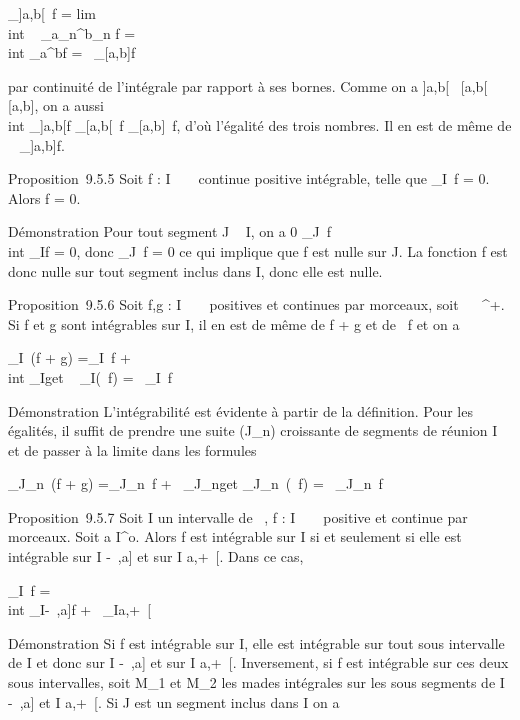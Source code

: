 \documentclass[]{article}
\begin{document}
\int  \_{]}a,b{[}~f
= lim\\int ~
\_a\_n^b\_n f =\\int
 \_a^bf =\int ~
\_{[}a,b{]}f

par continuité de l'intégrale par rapport à ses bornes. Comme on a
{]}a,b{[}\subset~ {[}a,b{[}\subset~ {[}a,b{]}, on a aussi \\int
 \_{]}a,b{[}f \leq\int  \_{[}a,b{[}~f
\leq\int  \_{[}a,b{]}~f, d'où l'égalité des
trois nombres. Il en est de même de \int ~
\_{]}a,b{]}f.

Proposition~9.5.5 Soit f : I \rightarrow~ ~ continue positive intégrable, telle que
\int  \_I~f = 0. Alors f = 0.

Démonstration Pour tout segment J \subset~ I, on a 0
\leq\int  \_J~f \leq\\int
 \_If = 0, donc \int  \_J~f = 0 ce
qui implique que f est nulle sur J. La fonction f est donc nulle sur
tout segment inclus dans I, donc elle est nulle.

Proposition~9.5.6 Soit f,g : I \rightarrow~ ~ positives et continues par morceaux,
soit \alpha~ \in {}~^+. Si f et g sont intégrables sur I, il en est de
même de f + g et de \alpha~f et on a

\int  \_I~(f + g)
=\int  \_I~f +\\int
 \_Ig\text et \int ~
\_I(\alpha~f) = \alpha~\int  \_I~f

Démonstration L'intégrabilité est évidente à partir de la définition.
Pour les égalités, il suffit de prendre une suite (J\_n)
croissante de segments de réunion I et de passer à la limite dans les
formules

\int  \_J\_n~(f + g)
=\int  \_J\_n~f
+\int ~
\_J\_ng\text et
\int  \_J\_n~(\alpha~f) =
\alpha~\int  \_J\_n~f

Proposition~9.5.7 Soit I un intervalle de ~, f : I \rightarrow~ ~ positive et
continue par morceaux. Soit a \in I^o. Alors f est intégrable
sur I si et seulement si elle est intégrable sur I\bigcap{]} -\infty~,a{]} et sur I
\bigcap {[}a,+\infty~{[}. Dans ce cas,

\int  \_I~f =\\int
 \_I\bigcap{]}-\infty~,a{]}f +\int ~
\_I\bigcap{[}a,+\infty~{[}

Démonstration Si f est intégrable sur I, elle est intégrable sur tout
sous intervalle de I et donc sur I\bigcap{]} -\infty~,a{]} et sur I \bigcap {[}a,+\infty~{[}.
Inversement, si f est intégrable sur ces deux sous intervalles, soit
M\_1 et M\_2 les ma\jmathorants des intégrales sur les sous
segments de I\bigcap{]} -\infty~,a{]} et I \bigcap {[}a,+\infty~{[}. Si J est un segment inclus
dans I on a
\end{document}
